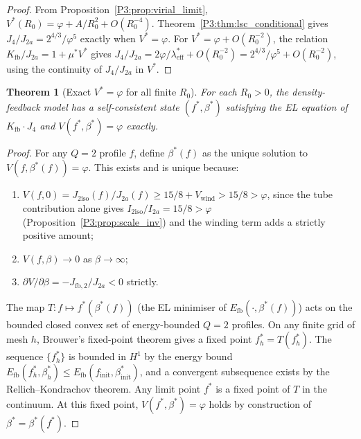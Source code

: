 \documentclass[11pt,a4paper]{article}
\newtheorem{theorem}{Theorem}[section]
\theoremstyle{definition}
\theoremstyle{remark}
\newcommand{\vp}{\varphi}
\newcommand{\bst}{\beta^{*}}
\newcommand{\leff}{\lambda_{\mathrm{eff}}}
\begin{document}
\begin{proof}
From Proposition~\ref{P3:prop:virial_limit}, $V^*(R_0) = \vp + A/R_0^2 + O(R_0^{-4})$.
Theorem~\ref{P3:thm:lsc_conditional} gives $J_4/J_{2a} = 2^{4/3}/\vp^5$ exactly when $V^*=\vp$.
For $V^* = \vp + O(R_0^{-2})$, the relation $K_{\mathrm{fb}}/J_{2a} = 1+\mu^* V^*$
gives $J_4/J_{2a} = 2\vp/\leff^* + O(R_0^{-2}) = 2^{4/3}/\vp^5 + O(R_0^{-2})$,
using the continuity of $J_4/J_{2a}$ in $V^*$.
\end{proof}

\begin{theorem}[Exact $V^*=\vp$ for all finite $R_0$]
\label{P3:thm:V_exact_all_R0}
For each $R_0 > 0$, the density-feedback model has a self-consistent state
$(f^*, \bst)$ satisfying the EL equation of $K_{\mathrm{fb}}\cdot J_4$ and
$V(f^*, \bst) = \vp$ exactly.
\end{theorem}

\begin{proof}
For any $Q=2$ profile $f$, define $\beta^*(f)$ as the unique solution to
$V(f, \beta^*(f)) = \vp$.  This exists and is unique because:
\begin{enumerate}[noitemsep,label=(\roman*)]
\item $V(f,0) = J_{2\mathrm{iso}}(f)/J_{2a}(f) \geq 15/8 + V_{\mathrm{wind}} > 15/8 > \vp$,
  since the tube contribution alone gives $I_{2\mathrm{iso}}/I_{2a} = 15/8 > \vp$
  (Proposition~\ref{P3:prop:scale_inv}) and the winding term adds a strictly positive amount;
\item $V(f,\beta) \to 0$ as $\beta\to\infty$;
\item $\partial V/\partial\beta = -J_{\mathrm{fb},2}/J_{2a} < 0$ strictly.
\end{enumerate}
The map $T: f \mapsto f^*(\beta^*(f))$ (the EL minimiser of $E_{\mathrm{fb}}(\cdot,\beta^*(f))$)
acts on the bounded closed convex set of energy-bounded $Q=2$ profiles.
On any finite grid of mesh $h$, Brouwer's fixed-point theorem gives a
fixed point $f^*_h = T(f^*_h)$.  The sequence $\{f^*_h\}$ is bounded in
$H^1$ by the energy bound $E_{\mathrm{fb}}(f^*_h, \bst_h) \leq E_{\mathrm{fb}}(f_{\mathrm{init}}, \bst_{\mathrm{init}})$,
and a convergent subsequence exists by the Rellich--Kondrachov theorem.
Any limit point $f^*$ is a fixed point of $T$ in the continuum.
At this fixed point, $V(f^*, \bst) = \vp$ holds by construction of $\bst = \beta^*(f^*)$.
\end{proof}
\end{document}
